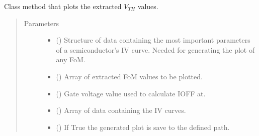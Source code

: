 \documentclass[letterpaper,10pt,english,openany, oneside]{sphinxmanual}
\begin{document}
\begin{fulllineitems}
\begin{fulllineitems}
\label{\detokenize{index:fompy.fom.ioff_ext.plot}}
Class method that plots the extracted \(V_{TH}\) values.
\begin{quote}\begin{description}
\item[{Parameters}] \leavevmode\begin{itemize}
\item {} 
 () \textendash{} Structure of data containing the most important parameters of a semiconductor’s IV curve.
Needed for generating the plot of any FoM.

\item {} 
 () \textendash{} Array of extracted FoM values to be plotted.

\item {} 
 () \textendash{} Gate voltage value used to calculate IOFF at.

\item {} 
 () \textendash{} Array of data containing the IV curves.

\item {} 
 () \textendash{} If True the generated plot is save to the defined path.

\end{itemize}

\end{description}\end{quote}

\end{fulllineitems}



\end{fulllineitems}
\end{document}
